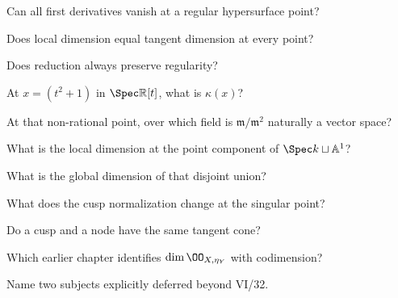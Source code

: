 \begin{exercise}[VI.32.E16] Can all first derivatives vanish at a regular hypersurface point?\end{exercise}
\begin{exercise}[VI.32.E17] Does local dimension equal tangent dimension at every point?\end{exercise}
\begin{exercise}[VI.32.E18] Does reduction always preserve regularity?\end{exercise}
\begin{exercise}[VI.32.E19] At $x=(t^2+1)$ in $\Spec\mathbb R[t]$, what is $\kappa(x)$?\end{exercise}
\begin{exercise}[VI.32.E20] At that non-rational point, over which field is $\mathfrak m/\mathfrak m^2$ naturally a vector space?\end{exercise}
\begin{exercise}[VI.32.E21] What is the local dimension at the point component of $\Spec k\sqcup\mathbb A^1$?\end{exercise}
\begin{exercise}[VI.32.E22] What is the global dimension of that disjoint union?\end{exercise}
\begin{exercise}[VI.32.E23] What does the cusp normalization change at the singular point?\end{exercise}
\begin{exercise}[VI.32.E24] Do a cusp and a node have the same tangent cone?\end{exercise}
\begin{exercise}[VI.32.E25] Which earlier chapter identifies $\dim\OO_{X,\eta_Y}$ with codimension?\end{exercise}
\begin{exercise}[VI.32.E26] Name two subjects explicitly deferred beyond VI/32.\end{exercise}
